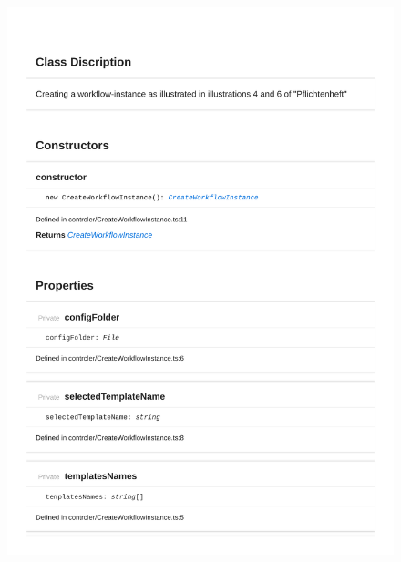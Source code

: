 \begin{figure}[H]
\centerline{\includegraphics[width=\textwidth]{FrontendDocsAsPDF/Model/CreateWorkflowInstance.pdf}}
\end{figure}

